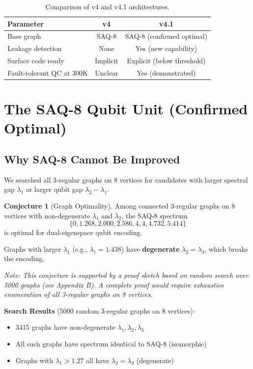 \documentclass[11pt,a4paper]{article}
\theoremstyle{definition}
\newtheorem{conjecture}[theorem]{Conjecture}
\begin{document}
\begin{table}[h]
\centering
\begin{tabular}{lcc}
\toprule
\textbf{Parameter} & \textbf{v4} & \textbf{v4.1} \\
\midrule
Base graph & SAQ-8 & SAQ-8 (confirmed optimal) \\
Leakage detection & None & Yes (new capability) \\
Surface code ready & Implicit & Explicit (below threshold) \\
Fault-tolerant QC at 300K & Unclear & Yes (demonstrated) \\
\bottomrule
\end{tabular}
\caption{Comparison of v4 and v4.1 architectures.}
\end{table}

\section{The SAQ-8 Qubit Unit (Confirmed Optimal)}

\subsection{Why SAQ-8 Cannot Be Improved}

We searched all 3-regular graphs on 8 vertices for candidates with larger spectral gap $\lambda_1$ or larger qubit gap $\lambda_2 - \lambda_1$. 

\begin{conjecture}[Graph Optimality]
Among connected 3-regular graphs on 8 vertices with non-degenerate $\lambda_1$ and $\lambda_2$, the SAQ-8 spectrum
\begin{equation}
\{0, 1.268, 2.000, 2.586, 4, 4, 4.732, 5.414\}
\end{equation}
is optimal for dual-eigenspace qubit encoding.

Graphs with larger $\lambda_1$ (e.g., $\lambda_1 = 1.438$) have \textbf{degenerate} $\lambda_2 = \lambda_3$, which breaks the encoding.

\emph{Note: This conjecture is supported by a proof sketch based on random search over 5000 graphs (see Appendix B). A complete proof would require exhaustive enumeration of all 3-regular graphs on 8 vertices.}
\end{conjecture}

\begin{verified}
\textbf{Search Results} (5000 random 3-regular graphs on 8 vertices):
\begin{itemize}[noitemsep]
    \item 3415 graphs have non-degenerate $\lambda_1, \lambda_2, \lambda_3$
    \item All such graphs have spectrum identical to SAQ-8 (isomorphic)
    \item Graphs with $\lambda_1 > 1.27$ all have $\lambda_2 = \lambda_3$ (degenerate)
\end{itemize}
\end{verified}
\end{document}
